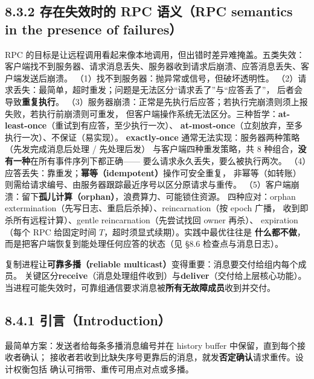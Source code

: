 
\subsection*{8.3.2 存在失效时的 RPC 语义（RPC semantics in the presence of failures）}
RPC 的目标是让远程调用看起来像本地调用，但出错时差异难掩盖。五类失效：
客户端找不到服务器、请求消息丢失、服务器收到请求后崩溃、应答消息丢失、客户端发送后崩溃。
（1）找不到服务器：抛异常或信号，但破坏透明性。
（2）请求丢失：最简单，超时重发；问题是无法区分“请求丢了”与“应答丢了”，
后者会导致\textbf{重复执行}。
（3）服务器崩溃：正常是先执行后应答；若执行完崩溃则须上报失败，若执行前崩溃则可重发，
但客户端操作系统无法区分。三种哲学：\textbf{at-least-once}（重试到有应答，至少执行一次）、
\textbf{at-most-once}（立刻放弃，至多执行一次）、不保证（易实现）。
\textbf{exactly-once} 通常无法实现：服务器两种策略（先发完成消息后处理 / 先处理后发）
与客户端四种重发策略，共 8 种组合，\textbf{没有一种}在所有事件序列下都正确——
要么请求永久丢失，要么被执行两次。
（4）应答丢失：靠重发；\textbf{幂等（idempotent）}操作可安全重复，
非幂等（如转账）则需给请求编号、由服务器跟踪最近序号以区分原请求与重传。
（5）客户端崩溃：留下\textbf{孤儿计算（orphan）}，浪费算力、可能锁住资源。
四种应对：orphan extermination（先写日志、重启后杀掉）、reincarnation（按 epoch 广播，
收到即杀所有远程计算）、gentle reincarnation（先尝试找回 owner 再杀）、
expiration（每个 RPC 给固定时间 $T$，超时须显式续期）。实践中最优往往是
\textbf{什么都不做}，而是把客户端恢复到能处理任何应答的状态（见 §8.6 检查点与消息日志）。

\begin{closeread}
\end{closeread}



复制进程让\textbf{可靠多播（reliable multicast）}变得重要：消息要交付给组内每个成员。
关键区分\textbf{receive}（消息处理组件收到）与\textbf{deliver}（交付给上层核心功能）。
当进程可能失效时，可靠组通信要求消息被\textbf{所有无故障成员}收到并交付。

\subsection*{8.4.1 引言（Introduction）}
最简单方案：发送者给每条多播消息编号并在 history buffer 中保留，直到每个接收者确认；
接收者若收到比缺失序号更靠后的消息，就发\textbf{否定确认}请求重传。设计权衡包括
确认可捎带、重传可用点对点或多播。

